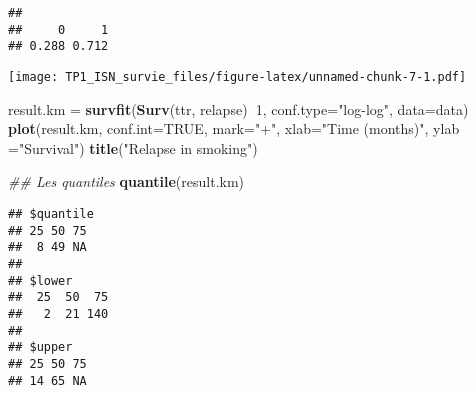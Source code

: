 \documentclass[
]{article}
\newenvironment{Shaded}{\begin{snugshade}}{\end{snugshade}}
\newcommand{\CommentTok}[1]{\textcolor[rgb]{0.56,0.35,0.01}{\textit{#1}}}
\newcommand{\DataTypeTok}[1]{\textcolor[rgb]{0.13,0.29,0.53}{#1}}
\newcommand{\DecValTok}[1]{\textcolor[rgb]{0.00,0.00,0.81}{#1}}
\newcommand{\KeywordTok}[1]{\textcolor[rgb]{0.13,0.29,0.53}{\textbf{#1}}}
\newcommand{\NormalTok}[1]{#1}
\newcommand{\OperatorTok}[1]{\textcolor[rgb]{0.81,0.36,0.00}{\textbf{#1}}}
\newcommand{\OtherTok}[1]{\textcolor[rgb]{0.56,0.35,0.01}{#1}}
\newcommand{\StringTok}[1]{\textcolor[rgb]{0.31,0.60,0.02}{#1}}
\begin{document}
\begin{Shaded}
\end{Shaded}

\begin{verbatim}
## 
##     0     1 
## 0.288 0.712
\end{verbatim}

\begin{Shaded}
\end{Shaded}

\texttt{[image: TP1\_ISN\_survie\_files/figure-latex/unnamed-chunk-7-1.pdf]}

\begin{Shaded}
\begin{Highlighting}[]
\NormalTok{result.km =}\StringTok{ }\KeywordTok{survfit}\NormalTok{(}\KeywordTok{Surv}\NormalTok{(ttr, relapse)}\OperatorTok{~}\DecValTok{1}\NormalTok{, }\DataTypeTok{conf.type=}\StringTok{"log-log"}\NormalTok{, }\DataTypeTok{data=}\NormalTok{data)}
\KeywordTok{plot}\NormalTok{(result.km, }\DataTypeTok{conf.int=}\OtherTok{TRUE}\NormalTok{, }\DataTypeTok{mark=}\StringTok{"+"}\NormalTok{, }\DataTypeTok{xlab=}\StringTok{"Time (months)"}\NormalTok{, }\DataTypeTok{ylab =}\StringTok{"Survival"}\NormalTok{)}
\KeywordTok{title}\NormalTok{(}\StringTok{"Relapse in smoking"}\NormalTok{)}

\CommentTok{## Les quantiles }
\KeywordTok{quantile}\NormalTok{(result.km)}
\end{Highlighting}
\end{Shaded}

\begin{verbatim}
## $quantile
## 25 50 75 
##  8 49 NA 
## 
## $lower
##  25  50  75 
##   2  21 140 
## 
## $upper
## 25 50 75 
## 14 65 NA
\end{verbatim}

\begin{Shaded}
\end{Shaded}
\end{document}
